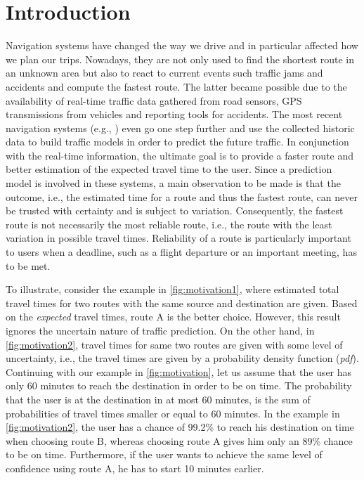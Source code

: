 \vspace{-0.4cm}
\section{Introduction}

Navigation systems have changed the way we drive and in particular affected how we plan our trips. Nowadays, they are not only used to find the shortest route in an unknown area but also to react to current events such traffic jams and accidents and compute the fastest route. The latter became possible due to the availability of real-time traffic data gathered from road sensors, GPS transmissions from vehicles and reporting tools for accidents. The most recent navigation systems (e.g., \cite{Pan13}) even go one step further and use the collected historic data to build traffic models in order to predict the future traffic. In conjunction with the real-time information, the ultimate goal is to provide a faster route and better estimation of the expected travel time to the user. Since a prediction model is involved in these systems, a main observation to be made is that the outcome, i.e., the estimated time for a route and thus the fastest route, can never be trusted with certainty and is subject to variation. Consequently, the fastest route is not necessarily the most reliable route, i.e., the route with the least variation in possible travel times. Reliability of a route is particularly important to users when a deadline, such as a flight departure or an important meeting, has to be met. 

To illustrate, consider the example in \cref{fig:motivation1}, where estimated total travel times for two routes with the same source and destination are given. Based on the \textit{expected} travel times, route A is the better choice. However, this result ignores the uncertain nature of traffic prediction. On the other hand, in \cref{fig:motivation2}, travel times for same two routes are given with some level of uncertainty, i.e., the travel times are given by a probability density function (\textit{pdf}). Continuing with our example in \cref{fig:motivation}, let us assume that the user has only 60 minutes to reach the destination in order to be on time. The probability that the user is at the destination in at most 60 minutes, is the sum of probabilities of travel times smaller or equal to 60 minutes. In the example in \cref{fig:motivation2}, the user has a chance of 99.2\% to reach his destination on time when choosing route B, whereas choosing route A gives him only an 89\% chance to be on time. Furthermore, if the user wants to achieve the same level of confidence using route A, he has to start 10 minutes earlier.

